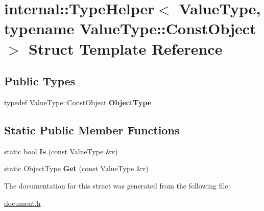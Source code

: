 \hypertarget{a02072}{}\section{internal\+:\+:Type\+Helper$<$ Value\+Type, typename Value\+Type\+:\+:Const\+Object $>$ Struct Template Reference}
\label{a02072}
\subsection*{Public Types}
\begin{DoxyCompactItemize}
\item 
\mbox{\label{a02072_a986df6ac09ceb6cc9ba9fd4d73e90495}} 
typedef Value\+Type\+::\+Const\+Object {\bfseries Object\+Type}
\end{DoxyCompactItemize}
\subsection*{Static Public Member Functions}
\begin{DoxyCompactItemize}
\item 
\mbox{\label{a02072_a843e707732c55f2178d399a0af13605a}} 
static bool {\bfseries Is} (const Value\+Type \&v)
\item 
\mbox{\label{a02072_ae6a797157c9b3d15ca4a32c48ea4bc73}} 
static Object\+Type {\bfseries Get} (const Value\+Type \&v)
\end{DoxyCompactItemize}


The documentation for this struct was generated from the following file\+:\begin{DoxyCompactItemize}
\item 
\hyperlink{a00476}{document.\+h}\end{DoxyCompactItemize}
